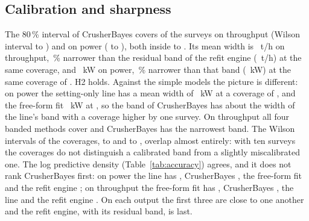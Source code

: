 \documentclass[journal]{IEEEtran}
\newcommand{\pct}{\,\%}
\begin{document}
\begin{table}[!t]
\caption{Paired differences of MAPE under the leave-one-survey-out folds, CrusherBayes minus each comparator (negative favours CrusherBayes; the published model of Rocha et al.\ set its $\lambda$ on survey 10, and the bare Bond draw and the engine at its shipped constants on power carry constants Rocha et al.\ fitted on these surveys, so these rows are not held out), with the 95\pct{} paired-bootstrap interval, the fraction of resamples favouring CrusherBayes and the surveys on which it has the lower error.}
\label{tab:paired}
\centering\footnotesize
\resizebox{\columnwidth}{!}{}
\end{table}

\subsection{Calibration and sharpness}

The 80\pct{} interval of CrusherBayes covers \cbTphCov{} of the surveys on throughput (Wilson interval \cbTphCovLo{} to
\cbTphCovHi) and \cbKwCov{} on power (\cbKwCovLo{} to \cbKwCovHi), both inside \covLo{} to \covHi. Its mean width is
\cbTphWidth~t/h on throughput, \widthRedTph\pct{} narrower than the residual band of the refit engine (\BackTphWidth~t/h) at
the same coverage, and \cbKwWidth~kW on power, \widthRedKw\pct{} narrower than that band (\BackKwWidth~kW) at the same
coverage of \cbKwCov. H2 holds. Against the simple models the picture is different: on power the setting-only line has a
mean width of \BlinKwWidth~kW at a coverage of \BlinKwCov, and the free-form fit \FreeKwWidth~kW at \FreeKwCov, so the band of
CrusherBayes has about the width of the line's band with a coverage higher by one survey. On throughput all four banded
methods cover \cbTphCov{} and CrusherBayes has the narrowest band. The Wilson intervals of the coverages, \cbKwCovLo{} to
\cbKwCovHi{} and \blinKwCovLo{} to \blinKwCovHi, overlap almost entirely: with ten surveys the coverages do not
distinguish a calibrated band from a slightly miscalibrated one. The log predictive density (Table~\ref{tab:accuracy}) agrees,
and it does not rank CrusherBayes first: on power the line has \BlinKwLpd, CrusherBayes \cbKwLpd, the free-form fit
\FreeKwLpd{} and the refit engine \BackKwLpd; on throughput the free-form fit has \FreeTphLpd, CrusherBayes \cbTphLpd, the
line \BlinTphLpd{} and the refit engine \BackTphLpd. On each output the first three are close to one another and the
refit engine, with its residual band, is last.
\end{document}
